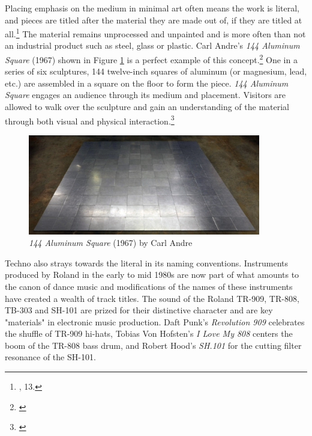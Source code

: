 \documentclass[12pt,twoside]{reedthesis}
\begin{document}
Placing emphasis on the medium in minimal art often means the work is literal, and pieces are titled after the material they are made out of, if they are titled at all.\footnote{\cite{batchelorMinimalism1997}, 13.} The material remains unprocessed and unpainted and is more often than not an industrial product such as steel, glass or plastic. Carl Andre's \emph{144 Aluminum Square} (1967) shown in Figure \ref{fig:carl} is a perfect example of this concept.\footnote{\cite{andre144AluminumSquare1967}} One in a series of six sculptures, 144 twelve-inch squares of aluminum (or magnesium, lead, etc.) are assembled in a square on the floor to form the piece. \emph{144 Aluminum Square} engages an audience through its medium and placement. Visitors are allowed to walk over the sculpture and gain an understanding of the material through both visual and physical interaction.\footnote{\cite{144MagnesiumSquare}}

\begin{figure}[htbp]
	\begin{centering}
		\includegraphics[width=4in]{./Images/Andre_144Aluminum}
		\caption{\emph{144 Aluminum Square} (1967) by Carl Andre}
		\label{fig:carl}
	\end{centering}
\end{figure}

Techno also strays towards the literal in its naming conventions. Instruments produced by Roland in the early to mid 1980s are now part of what amounts to the canon of dance music and modifications of the names of these instruments have created a wealth of track titles. The sound of the Roland TR-909, TR-808, TB-303 and SH-101 are prized for their distinctive character and are key "materials" in electronic music production. Daft Punk's \emph{Revolution 909} celebrates the shuffle of TR-909 hi-hats, Tobias Von Hofsten's \emph{I Love My 808} centers the boom of the TR-808 bass drum, and Robert Hood's \emph{SH.101} for the cutting filter resonance of the SH-101.
\end{document}
